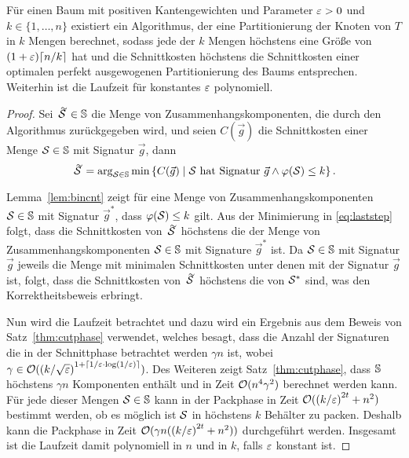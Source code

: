     \begin{thm}\label{thm:treealg}
        Für einen Baum mit positiven Kantengewichten und Parameter $\varepsilon > 0$ und $k \in \{1, \ldots, n\}$ existiert ein Algorithmus, der eine Partitionierung der Knoten von $T$ in $k$ Mengen berechnet, sodass jede der $k$ Mengen höchstens eine Größe von $(1 + \eps) \ceil*{n/k}$ hat und die Schnittkosten höchstens die Schnittkosten einer optimalen perfekt ausgewogenen Partitionierung des Baums entsprechen. 
        Weiterhin ist die Laufzeit für konstantes $\varepsilon$ polynomiell.
    \end{thm}
    \begin{proof}
        Sei $\tildaS \in \bbS$ die Menge von Zusammenhangskomponenten, die durch den Algorithmus zurückgegeben wird, und seien $C(\vec{g})$ die Schnittkosten einer Menge $\mathcal{S} \in \mathbb{S}$ mit Signatur $\vec{g}$, dann
        \begin{equation}\label{eq:laststep}
            \tildaS = \arg_{\calS \in \bbS} \min \left\{ C(\vec{g}) \mid \calS\ \text{hat Signatur}\ \vec{g} \land \varphi(\calS) \leq k \right\}.
        \end{equation}

        Lemma~\ref{lem:bincnt} zeigt für eine Menge von Zusammenhangskomponenten $\mathcal{S} \in \mathbb{S}$ mit Signatur $\vec{g}^*$, dass $\varphi(\mathcal{S}) \leq k$ gilt.
        Aus der Minimierung in \eqref{eq:laststep} folgt, dass die Schnittkosten von $\tildaS$ höchstens die der Menge von Zusammenhangskomponenten $\mathcal{S} \in \mathbb{S}$ mit Signature $\vec{g}^*$ ist.
        Da $\mathcal{S} \in \mathbb{S}$ mit Signatur $\vec{g}$ jeweils die Menge mit minimalen Schnittkosten unter denen mit der Signatur $\vec{g}$ ist, folgt, dass die Schnittkosten von $\tildaS$ höchstens die von $\mathcal{S}^*$ sind, was den Korrektheitsbeweis erbringt.

        Nun wird die Laufzeit betrachtet und dazu wird ein Ergebnis aus dem Beweis von Satz~\ref{thm:cutphase} verwendet, welches besagt, dass die Anzahl der Signaturen die in der Schnittphase betrachtet werden $\gamma n$ ist, wobei $\gamma \in \mathcal{O}({(k/\sqrt{\varepsilon})}^{1 + \lceil1/\varepsilon \cdot \log(1/\varepsilon)\rceil})$. 
        Des Weiteren zeigt Satz~\ref{thm:cutphase}, dass $\mathbb{S}$ höchstens $\gamma n$ Komponenten enthält und in Zeit $\mathcal{O}(n^4 \gamma^2)$ berechnet werden kann. 
        Für jede dieser Mengen $\mathcal{S} \in \mathbb{S}$ kann in der Packphase in Zeit $\mathcal{O}({(k/\varepsilon)}^{2t} + n^2)$ bestimmt werden, ob es möglich ist $\mathcal{S}$ in höchstens $k$ Behälter zu packen.
        Deshalb kann die Packphase in Zeit $\mathcal{O}(\gamma n ({(k/\varepsilon)}^{2t} + n^2))$ durchgeführt werden.
        Insgesamt ist die Laufzeit damit polynomiell in $n$ und in $k$, falls $\varepsilon$ konstant ist.
    \end{proof}

